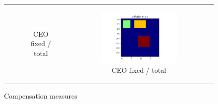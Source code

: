 \documentclass{article}
\begin{document}
\begin{figure}[!h]
\begin{tabular}[c]{c|c|c|c}
\begin{subfigure}[c]{0.35\textwidth}
      \caption{CEO fixed / total}
      \label{fig:ceoc}
    \end{subfigure}&
    \begin{subfigure}[c]{0.35\textwidth}
      \includegraphics[width=\textwidth]{images/grid-t0-x0.png}
      \caption{CEO fixed / total}
      \label{fig:ceod}
    \end{subfigure}
  \end{tabular}    
  \caption{Compensation measures}
  \label{fig:ceo}
\end{figure}
\end{document}
